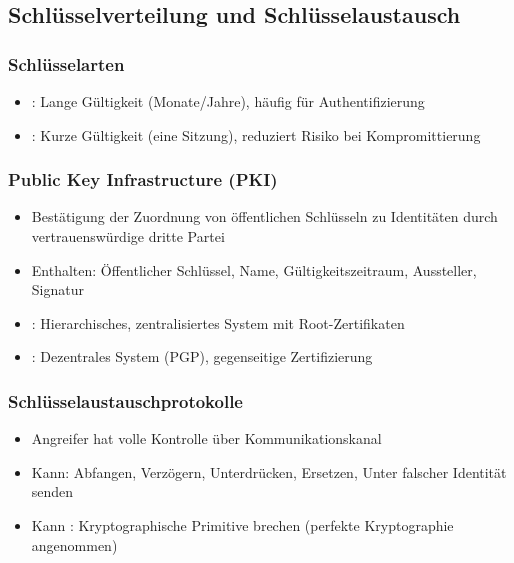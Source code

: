 \documentclass[
../../css_summary.tex,
]
{subfiles}
\begin{document}
\subsection{Schlüsselverteilung und Schlüsselaustausch}

\subsubsection{Schlüsselarten}

\begin{itemize}
   \item {}: Lange Gültigkeit (Monate/Jahre), häufig für Authentifizierung
   \item {}: Kurze Gültigkeit (eine Sitzung), reduziert Risiko bei Kompromittierung
\end{itemize}

\subsubsection*{Public Key Infrastructure (PKI)}

\begin{defbox}[Zertifikate]
   \begin{itemize}
      \item Bestätigung der Zuordnung von öffentlichen Schlüsseln zu Identitäten durch vertrauenswürdige dritte Partei
      \item Enthalten: Öffentlicher Schlüssel, Name, Gültigkeitszeitraum, Aussteller, Signatur
      \item {}: Hierarchisches, zentralisiertes System mit Root-Zertifikaten
      \item {}: Dezentrales System (PGP), gegenseitige Zertifizierung
   \end{itemize}
\end{defbox}

\subsubsection{Schlüsselaustauschprotokolle}

\begin{defbox}
   \begin{itemize}
      \item Angreifer hat volle Kontrolle über Kommunikationskanal
      \item Kann: Abfangen, Verzögern, Unterdrücken, Ersetzen, Unter falscher Identität senden
      \item Kann : Kryptographische Primitive brechen (perfekte Kryptographie angenommen)
   \end{itemize}
\end{defbox}
\end{document}
